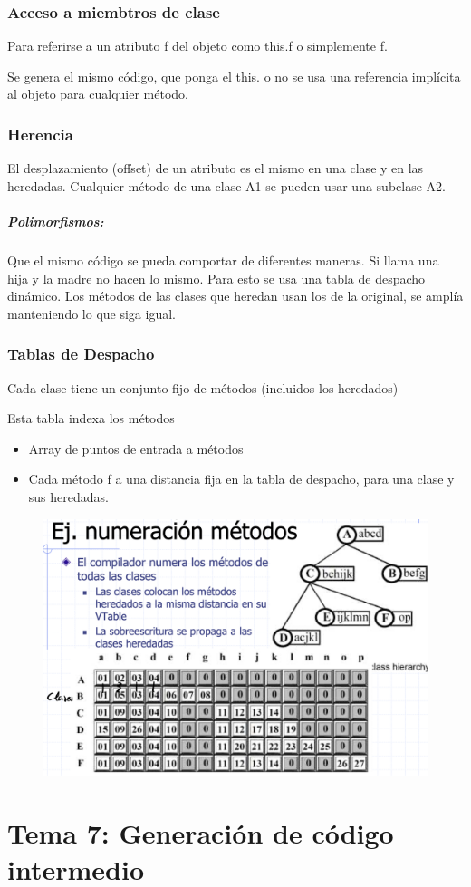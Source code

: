 \documentclass[12pt, twoside, openright]{report} %
\begin{document}
\subsection{Acceso a miembtros de clase}
Para referirse a un atributo f del objeto como this.f o simplemente f.

Se genera el mismo código, que ponga el this. o no se usa una referencia implícita al objeto para cualquier método.

\subsection{Herencia}
El desplazamiento (offset) de un atributo es el mismo en una clase y en las heredadas. Cualquier método de una clase A1 se pueden usar una subclase A2.

\paragraph{Polimorfismos:} Que el mismo código se pueda comportar de diferentes maneras. Si llama una hija y la madre no hacen lo mismo. Para esto se usa una tabla de despacho dinámico.
Los métodos de las clases que heredan usan los de la original, se amplía manteniendo lo que siga igual.
\pagebreak
\subsection{Tablas de Despacho}
Cada clase tiene un conjunto fijo de métodos (incluidos los heredados)

Esta tabla indexa los métodos
\begin{itemize}
  \item Array de puntos de entrada a métodos
  \item Cada método f a una distancia fija en la tabla de despacho, para una clase y sus heredadas.
\end{itemize}
\begin{figure}[H]
  {\includegraphics[scale=.35]{Screenshot 2021-06-09 at 13.02.04}}
\end{figure}

\chapter{Tema 7: Generación de código intermedio}

\end{document}
